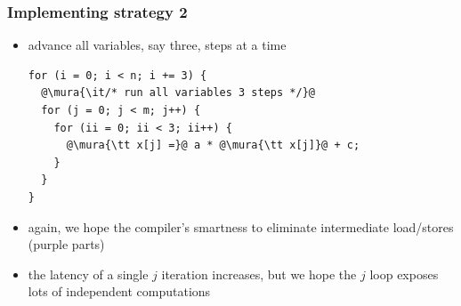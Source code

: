 \documentclass[12pt,dvipdfmx]{beamer}
\newcommand{\mura}[1]{{\color{purple}#1}}
\begin{document}
\begin{frame}[fragile]
\frametitle{Implementing strategy 2}
\begin{itemize}
\item advance all variables, say three, steps at a time
\begin{lstlisting}
for (i = 0; i < n; i += 3) {
  @\mura{\it/* run all variables 3 steps */}@
  for (j = 0; j < m; j++) {
    for (ii = 0; ii < 3; ii++) {
      @\mura{\tt x[j] =}@ a * @\mura{\tt x[j]}@ + c;
    }
  }
}
\end{lstlisting}

\item again, we hope the compiler's smartness
  to eliminate intermediate load/stores (\mura{purple
    parts})

\item the latency of a single $j$ iteration
  increases, but we hope the $j$ loop exposes
  lots of independent computations
\end{itemize}
\end{frame}
\end{document}
